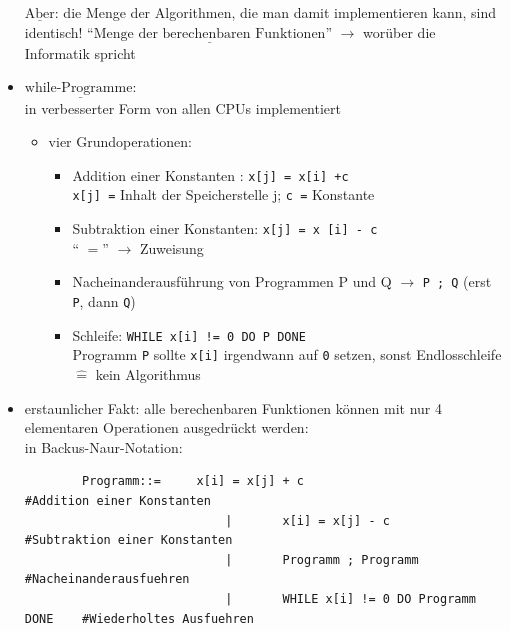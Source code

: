 \documentclass[11pt, fleqn]{scrreprt}
\begin{document}
\begin{itemize}[label={–}]
    $\underline{\text{Aber}}$: die Menge der Algorithmen, die man damit implementieren kann, sind identisch!
    ``$\underline{\text{Menge der berechenbaren Funktionen}}$'' $\rightarrow$ worüber die Informatik spricht



    \item $\underline{\text{while-Programme:}}$ \\
        in verbesserter Form von allen CPUs implementiert
    \begin{itemize}[label={-}]
        \item vier Grundoperationen:
        \begin{itemize}
            \item Addition einer Konstanten : \verb|x[j] = x[i] +c| \\
            \verb|x[j] =| Inhalt der Speicherstelle j; \verb|c =| Konstante
            \item Subtraktion einer Konstanten: \verb|x[j] = x [i] - c| \\
             `` $=$'' $\rightarrow$ Zuweisung
            \item Nacheinanderausführung von Programmen P und Q $\rightarrow$ \verb|P ; Q| (erst \verb|P|, dann \verb|Q|)
            \item Schleife:  \verb|WHILE x[i] != 0 DO P DONE| \\
            Programm \verb|P| sollte \verb|x[i]| irgendwann auf \verb|0| setzen, sonst Endlosschleife $\widehat{=}$ kein Algorithmus
        \end{itemize}
    \end{itemize}


    \item erstaunlicher Fakt: alle berechenbaren Funktionen können mit nur 4 elementaren Operationen ausgedrückt werden: \\
    in Backus-Naur-Notation:


    \begin{verbatim}
        Programm::=     x[i] = x[j] + c                                 #Addition einer Konstanten
                            |       x[i] = x[j] - c                     #Subtraktion einer Konstanten
                            |       Programm ; Programm                 #Nacheinanderausfuehren
                            |       WHILE x[i] != 0 DO Programm DONE    #Wiederholtes Ausfuehren
    \end{verbatim}



\end{itemize}
\end{document}
